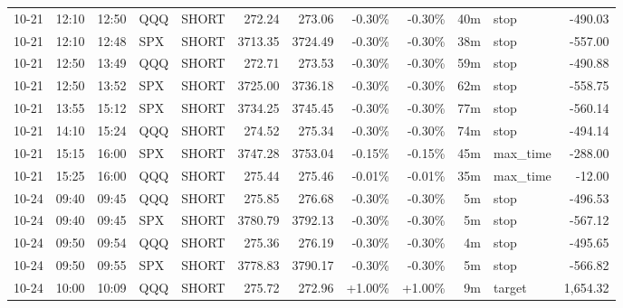 \documentclass[11pt,a4paper,twoside]{article}
\begin{document}
\begin{center}
\begin{longtable}{>{\color{txtmain}}l l l l l r r r r r >{\color{txtmain}}l r}
10-21 & 12:10 & 12:50 & QQQ & SHORT & 272.24 & 273.06 & \textcolor{lossred}{-0.30\%} & \textcolor{lossred}{-0.30\%} & 40m & stop & \textcolor{lossred}{-490.03} \\
10-21 & 12:10 & 12:48 & SPX & SHORT & 3713.35 & 3724.49 & \textcolor{lossred}{-0.30\%} & \textcolor{lossred}{-0.30\%} & 38m & stop & \textcolor{lossred}{-557.00} \\
10-21 & 12:50 & 13:49 & QQQ & SHORT & 272.71 & 273.53 & \textcolor{lossred}{-0.30\%} & \textcolor{lossred}{-0.30\%} & 59m & stop & \textcolor{lossred}{-490.88} \\
10-21 & 12:50 & 13:52 & SPX & SHORT & 3725.00 & 3736.18 & \textcolor{lossred}{-0.30\%} & \textcolor{lossred}{-0.30\%} & 62m & stop & \textcolor{lossred}{-558.75} \\
10-21 & 13:55 & 15:12 & SPX & SHORT & 3734.25 & 3745.45 & \textcolor{lossred}{-0.30\%} & \textcolor{lossred}{-0.30\%} & 77m & stop & \textcolor{lossred}{-560.14} \\
10-21 & 14:10 & 15:24 & QQQ & SHORT & 274.52 & 275.34 & \textcolor{lossred}{-0.30\%} & \textcolor{lossred}{-0.30\%} & 74m & stop & \textcolor{lossred}{-494.14} \\
10-21 & 15:15 & 16:00 & SPX & SHORT & 3747.28 & 3753.04 & \textcolor{lossred}{-0.15\%} & \textcolor{lossred}{-0.15\%} & 45m & max\_time & \textcolor{lossred}{-288.00} \\
10-21 & 15:25 & 16:00 & QQQ & SHORT & 275.44 & 275.46 & \textcolor{lossred}{-0.01\%} & \textcolor{lossred}{-0.01\%} & 35m & max\_time & \textcolor{lossred}{-12.00} \\
10-24 & 09:40 & 09:45 & QQQ & SHORT & 275.85 & 276.68 & \textcolor{lossred}{-0.30\%} & \textcolor{lossred}{-0.30\%} & 5m & stop & \textcolor{lossred}{-496.53} \\
10-24 & 09:40 & 09:45 & SPX & SHORT & 3780.79 & 3792.13 & \textcolor{lossred}{-0.30\%} & \textcolor{lossred}{-0.30\%} & 5m & stop & \textcolor{lossred}{-567.12} \\
10-24 & 09:50 & 09:54 & QQQ & SHORT & 275.36 & 276.19 & \textcolor{lossred}{-0.30\%} & \textcolor{lossred}{-0.30\%} & 4m & stop & \textcolor{lossred}{-495.65} \\
10-24 & 09:50 & 09:55 & SPX & SHORT & 3778.83 & 3790.17 & \textcolor{lossred}{-0.30\%} & \textcolor{lossred}{-0.30\%} & 5m & stop & \textcolor{lossred}{-566.82} \\
10-24 & 10:00 & 10:09 & QQQ & SHORT & 275.72 & 272.96 & \textcolor{wingreen}{+1.00\%} & \textcolor{wingreen}{+1.00\%} & 9m & target & \textcolor{wingreen}{1,654.32} \\

\end{longtable}
\end{center}
\end{document}
